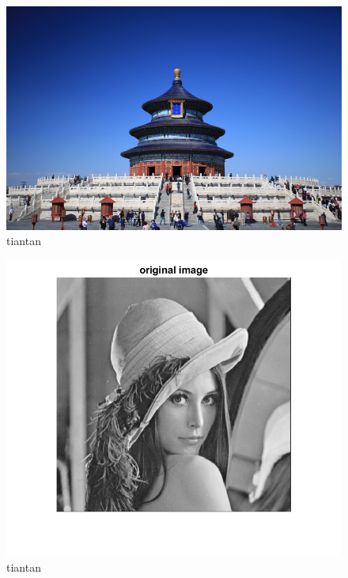 \documentclass{article}
\begin{document}
	\begin{figure}[!hbtp]
		\centering
		\includegraphics[width=\linewidth]{tiantan.jpg}
		\caption{tiantan}
		\label{fig:tiantan}
	\end{figure}
\clearpage
\begin{figure}[!hbtp]
	\centering
	\includegraphics[width=\linewidth]{origin.png}
	\caption{tiantan}
	\label{fig:tiantan}
\end{figure}
\clearpage
\end{document}
